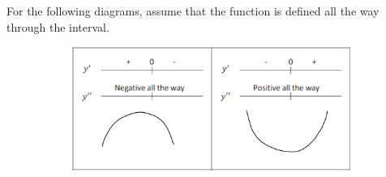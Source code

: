 \documentclass{article}
\begin{document}
For the following diagrams, assume that the function is defined all the way through the interval.
\begin{figure}[ht]
    \centering
    \begin{subfigure}[b]{0.9\textwidth}
        \centering
        \includegraphics[width=\linewidth]{imgs/diagram_1_2.png}
        \caption{}
    \end{subfigure}
    

\end{figure}
\end{document}
